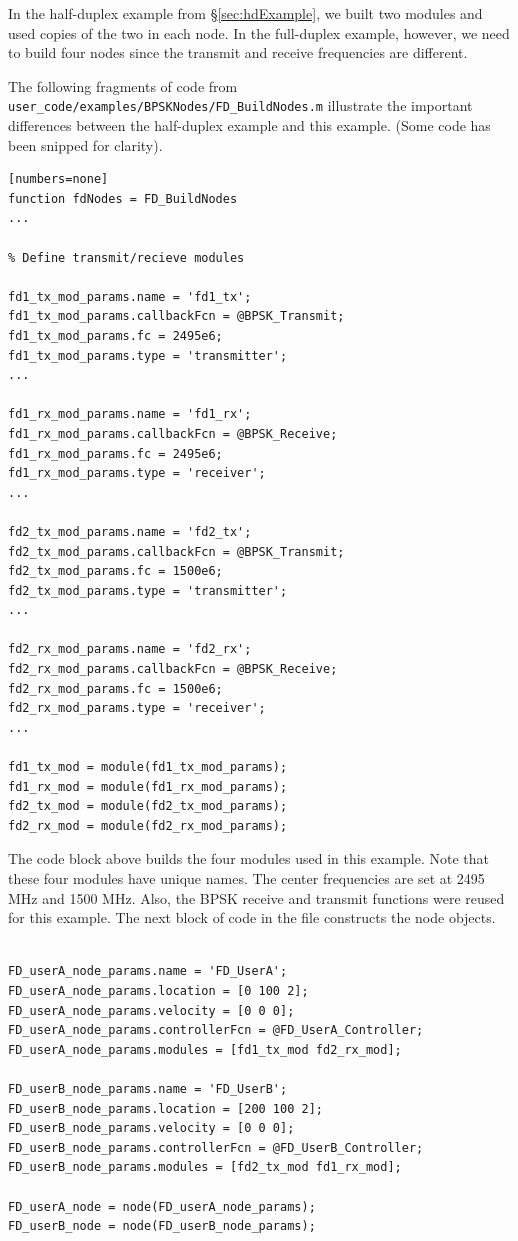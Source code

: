 In the half-duplex example from \S\ref{sec:hdExample}, we built two
modules and used copies of the two in each node. In the full-duplex
example, however, we need to build four nodes since the transmit and
receive frequencies are different.

The following fragments of code from
\verb+user_code/examples/BPSKNodes/FD_BuildNodes.m+ illustrate the important
differences between the half-duplex example and this example.  (Some
code has been snipped for clarity).

\begin{lstlisting}[name=fdBuildNodes][numbers=none]
function fdNodes = FD_BuildNodes
...

% Define transmit/recieve modules

fd1_tx_mod_params.name = 'fd1_tx';
fd1_tx_mod_params.callbackFcn = @BPSK_Transmit;
fd1_tx_mod_params.fc = 2495e6;
fd1_tx_mod_params.type = 'transmitter';
...

fd1_rx_mod_params.name = 'fd1_rx';
fd1_rx_mod_params.callbackFcn = @BPSK_Receive;
fd1_rx_mod_params.fc = 2495e6;
fd1_rx_mod_params.type = 'receiver';
...

fd2_tx_mod_params.name = 'fd2_tx';
fd2_tx_mod_params.callbackFcn = @BPSK_Transmit;
fd2_tx_mod_params.fc = 1500e6;
fd2_tx_mod_params.type = 'transmitter';
...

fd2_rx_mod_params.name = 'fd2_rx';
fd2_rx_mod_params.callbackFcn = @BPSK_Receive;
fd2_rx_mod_params.fc = 1500e6;
fd2_rx_mod_params.type = 'receiver';
...

fd1_tx_mod = module(fd1_tx_mod_params);
fd1_rx_mod = module(fd1_rx_mod_params);
fd2_tx_mod = module(fd2_tx_mod_params);
fd2_rx_mod = module(fd2_rx_mod_params);

\end{lstlisting}

The code block above builds the four modules used in this example.
Note that these four modules have unique names.  The center
frequencies are set at 2495 MHz and 1500 MHz.  Also, the BPSK
receive and transmit functions were reused for this example.  The
next block of code in the file constructs the node objects.

\begin{lstlisting}[name=fdBuildNodes]
% Define nodes

FD_userA_node_params.name = 'FD_UserA';
FD_userA_node_params.location = [0 100 2];
FD_userA_node_params.velocity = [0 0 0];
FD_userA_node_params.controllerFcn = @FD_UserA_Controller;
FD_userA_node_params.modules = [fd1_tx_mod fd2_rx_mod];

FD_userB_node_params.name = 'FD_UserB';
FD_userB_node_params.location = [200 100 2];
FD_userB_node_params.velocity = [0 0 0];
FD_userB_node_params.controllerFcn = @FD_UserB_Controller;
FD_userB_node_params.modules = [fd2_tx_mod fd1_rx_mod];

FD_userA_node = node(FD_userA_node_params);
FD_userB_node = node(FD_userB_node_params);
\end{lstlisting}

